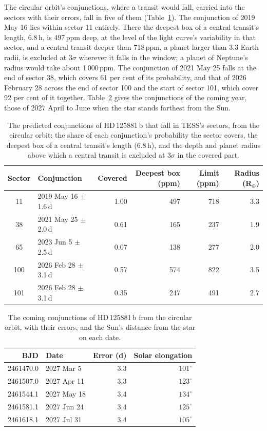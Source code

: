 \documentclass[3p,11pt]{elsarticle}
\begin{document}
The circular orbit's conjunctions, where a transit would fall, carried into the sectors with their
errors, fall in five of them (Table~\ref{tab:tess}). The conjunction of 2019 May 16 lies within sector
11 entirely. There the deepest box of a central transit's length, 6.8\,h, is 497\,ppm deep, at the
level of the light curve's variability in that sector, and a central transit deeper than 718\,ppm, a
planet larger than 3.3 Earth radii, is excluded at $3\sigma$ wherever it falls in the window; a planet
of Neptune's radius would take about 1\,000\,ppm. The conjunction of 2021 May 25 falls at the end of
sector 38, which covers 61 per cent of its probability, and that of 2026 February 28 across the end of
sector 100 and the start of sector 101, which cover 92 per cent of it together.
Table~\ref{tab:conjunctions} gives the conjunctions of the coming year, those of 2027 April to June
when the star stands farthest from the Sun.

\begin{table}[!htbp]
\centering
\caption{The predicted conjunctions of HD\,125881\,b that fall in TESS's sectors, from the circular
orbit: the share of each conjunction's probability the sector covers, the deepest box of a central
transit's length (6.8\,h), and the depth and planet radius above which a central transit is excluded at
$3\sigma$ in the covered part.}\label{tab:tess}
\small
\begin{tabular}{c l r r r r}
\toprule
Sector & Conjunction & Covered & Deepest box (ppm) & Limit (ppm) & Radius (R$_\oplus$) \\
\midrule
11 & 2019 May 16 $\pm$ 1.6\,d & 1.00 & 497 & 718 & 3.3 \\
38 & 2021 May 25 $\pm$ 2.0\,d & 0.61 & 165 & 237 & 1.9 \\
65 & 2023 Jun 5 $\pm$ 2.5\,d & 0.07 & 138 & 277 & 2.0 \\
100 & 2026 Feb 28 $\pm$ 3.1\,d & 0.57 & 574 & 822 & 3.5 \\
101 & 2026 Feb 28 $\pm$ 3.1\,d & 0.35 & 247 & 491 & 2.7 \\
\bottomrule
\end{tabular}
\end{table}

\begin{table}[!htbp]
\centering
\caption{The coming conjunctions of HD\,125881\,b from the circular orbit, with their errors, and the
Sun's distance from the star on each date.}\label{tab:conjunctions}
\begin{tabular}{r l r r}
\toprule
BJD & Date & Error (d) & Solar elongation \\
\midrule
2461470.0 & 2027 Mar 5 & 3.3 & $101^\circ$ \\
2461507.0 & 2027 Apr 11 & 3.3 & $123^\circ$ \\
2461544.1 & 2027 May 18 & 3.4 & $134^\circ$ \\
2461581.1 & 2027 Jun 24 & 3.4 & $125^\circ$ \\
2461618.1 & 2027 Jul 31 & 3.4 & $105^\circ$ \\
\bottomrule
\end{tabular}
\end{table}
\end{document}
